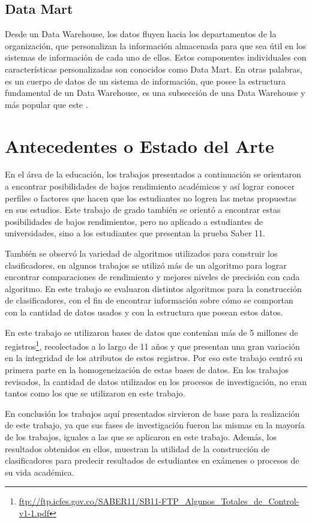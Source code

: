 \subsection{Data Mart}
Desde un Data Warehouse, los datos fluyen hacia los departamentos de la organización, que personalizan la información almacenada para que sea útil en los sistemas de información de cada uno de ellos. Estos componentes individuales con características personalizadas son conocidos como Data Mart. En otras palabras, es un cuerpo de datos de un sistema de información, que posee la estructura fundamental de un Data Warehouse, es una subsección de una Data Warehouse y más popular que este \cite{key-90}.
\section{Antecedentes o Estado del Arte}
En el área de la educación, los trabajos presentados a continuación se orientaron a encontrar posibilidades de bajos rendimiento académicos y así lograr conocer perfiles o factores que hacen que los estudiantes no logren las metas propuestas en sus estudios. Este trabajo de grado también se orientó a encontrar estas posibilidades de bajos rendimientos, pero no aplicado a estudiantes de universidades, sino a los estudiantes que presentan la prueba Saber 11\degree.

También se observó la variedad de algoritmos utilizados para construir los clasificadores, en algunos trabajos se utilizó más de un algoritmo para lograr encontrar comparaciones de rendimiento y mejores niveles de precisión con cada algoritmo. En este trabajo se evaluaron distintos algoritmos para la construcción de clasificadores, con el fin de encontrar información sobre cómo se comportan con la cantidad de datos usados y con la estructura que posean estos datos.

En este trabajo se utilizaron bases de datos que contenían más de 5 millones de registros\footnote{\url{ftp://ftp.icfes.gov.co/SABER11/SB11-FTP_Algunos_Totales_de_Control-v1-1.pdf}}, recolectados a lo largo de 11 años y que presentan una gran variación en la integridad de los atributos de estos registros. Por eso este trabajo centró su primera parte en la homogeneización de estas bases de datos. En los trabajos revisados, la cantidad de datos utilizados en los procesos de investigación, no eran tantos como los que se utilizaron en este trabajo.

En conclusión los trabajos aquí presentados sirvieron de base para la realización de este trabajo, ya que sus fases de investigación fueron las mismas en la mayoría de los trabajos, iguales a las que se aplicaron en este trabajo. Además, los resultados obtenidos en ellos, muestran la utilidad de la construcción de clasificadores para predecir resultados de estudiantes en exámenes o procesos de su vida académica.
